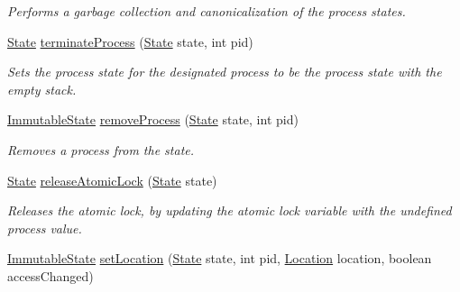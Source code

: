 \begin{DoxyCompactItemize}
\begin{DoxyCompactList}\small\item\em Performs a garbage collection and canonicalization of the process states. \end{DoxyCompactList}\item 
\hyperlink{interfaceedu_1_1udel_1_1cis_1_1vsl_1_1civl_1_1state_1_1IF_1_1State}{State} \hyperlink{classedu_1_1udel_1_1cis_1_1vsl_1_1civl_1_1state_1_1common_1_1immutable_1_1ImmutableStateFactory_a5318c37923f7a29e4ea586e4ed241f25}{terminate\+Process} (\hyperlink{interfaceedu_1_1udel_1_1cis_1_1vsl_1_1civl_1_1state_1_1IF_1_1State}{State} state, int pid)
\begin{DoxyCompactList}\small\item\em Sets the process state for the designated process to be the process state with the empty stack. \end{DoxyCompactList}\item 
\hyperlink{classedu_1_1udel_1_1cis_1_1vsl_1_1civl_1_1state_1_1common_1_1immutable_1_1ImmutableState}{Immutable\+State} \hyperlink{classedu_1_1udel_1_1cis_1_1vsl_1_1civl_1_1state_1_1common_1_1immutable_1_1ImmutableStateFactory_a1c324a5c8166701c1e6037005598f87b}{remove\+Process} (\hyperlink{interfaceedu_1_1udel_1_1cis_1_1vsl_1_1civl_1_1state_1_1IF_1_1State}{State} state, int pid)
\begin{DoxyCompactList}\small\item\em Removes a process from the state. \end{DoxyCompactList}\item 
\hyperlink{interfaceedu_1_1udel_1_1cis_1_1vsl_1_1civl_1_1state_1_1IF_1_1State}{State} \hyperlink{classedu_1_1udel_1_1cis_1_1vsl_1_1civl_1_1state_1_1common_1_1immutable_1_1ImmutableStateFactory_aaba1752dba05b39dc8fa982e1ee682d8}{release\+Atomic\+Lock} (\hyperlink{interfaceedu_1_1udel_1_1cis_1_1vsl_1_1civl_1_1state_1_1IF_1_1State}{State} state)
\begin{DoxyCompactList}\small\item\em Releases the atomic lock, by updating the atomic lock variable with the undefined process value. \end{DoxyCompactList}\item 
\hyperlink{classedu_1_1udel_1_1cis_1_1vsl_1_1civl_1_1state_1_1common_1_1immutable_1_1ImmutableState}{Immutable\+State} \hyperlink{classedu_1_1udel_1_1cis_1_1vsl_1_1civl_1_1state_1_1common_1_1immutable_1_1ImmutableStateFactory_a02d59626c894538bab15a0e459c7b1ae}{set\+Location} (\hyperlink{interfaceedu_1_1udel_1_1cis_1_1vsl_1_1civl_1_1state_1_1IF_1_1State}{State} state, int pid, \hyperlink{interfaceedu_1_1udel_1_1cis_1_1vsl_1_1civl_1_1model_1_1IF_1_1location_1_1Location}{Location} location, boolean access\+Changed)

\end{DoxyCompactItemize}
